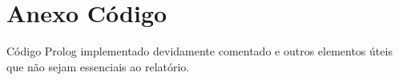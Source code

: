 \documentclass[a4paper]{article}
\begin{document}
\clearpage
{}
\renewcommand\refname{Bibliografia}



\newpage
\appendix
\section{Anexo Código}
Código Prolog implementado devidamente comentado e outros elementos úteis que não sejam essenciais ao relatório.
\end{document}
